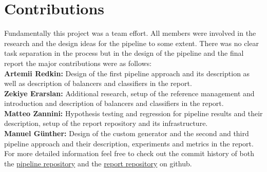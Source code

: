 \section{Contributions}

Fundamentally this project was a team effort. All members were involved in the research and the design ideas for the pipeline to some extent.
There was no clear task separation in the process but in the design of the pipeline and the final report the major contributions were as follows:\\

\textbf{Artemii Redkin:} Design of the first pipeline approach and its description as well as description of balancers and classifiers in the report.\\

\textbf{Zekiye Erarslan:} Additional research, setup of the reference management and introduction and description of balancers and classifiers in the report.\\

\textbf{Matteo Zannini:} Hypothesis testing and regression for pipeline results and their description, setup of the report repository and its infrastructure.\\

\textbf{Manuel Günther:} Design of the custom generator and the second and third pipeline approach and their description, experiments and metrics in the report.\\

For more detailed information feel free to check out the commit history of both the \href{https://github.com/gnthr-solve/TP_ML_Pipeline}{pipeline repository}
and the \href{https://github.com/gnthr-solve/TP_ML_PL_report}{report repository} on github.
